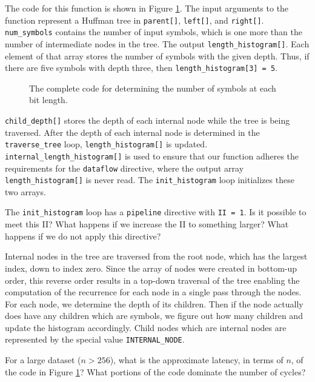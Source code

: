 The code for this function is shown in Figure \ref{fig:huffman_compute_bit_length.cpp}.  The input arguments to the function represent a Huffman tree in \lstinline{parent[]}, \lstinline{left[]}, and \lstinline{right[]}.   \lstinline{num_symbols} contains the number of input symbols, which is one more than the number of intermediate nodes in the tree.  The output \lstinline{length_histogram[]}.  Each element of that array stores the number of symbols with the given depth. Thus, if there are five symbols with depth three, then \lstinline{length_histogram[3] = 5}. 
\begin{figure}
{\tiny }
\caption{The complete code for determining the number of symbols at each bit length.}
\label{fig:huffman_compute_bit_length.cpp}
\end{figure}

\lstinline{child_depth[]} stores the depth of each internal node while the tree is being traversed.  After the depth of each internal node is determined in the \lstinline{traverse_tree} loop, \lstinline{length_histogram[]} is updated.  \lstinline{internal_length_histogram[]} is used to ensure that our function adheres the requirements for the \lstinline{dataflow} directive, where the output array \lstinline{length_histogram[]} is never read.  The \lstinline{init_histogram} loop initializes these two arrays.

\begin{exercise}
The \lstinline{init_histogram} loop has a \lstinline{pipeline} directive with \lstinline{II = 1}. Is it possible to meet this II? What happens if we increase the II to something larger? What happens if we do not apply this directive?
\end{exercise}

Internal nodes in the tree are traversed from the root node, which has the largest index, down to index zero.  Since the array of nodes were created in bottom-up order, this reverse order results in a top-down traversal of the tree enabling the computation of the recurrence for each node in a single pass through the nodes.  For each node, we determine the depth of its children.  Then if the node actually does have any children which are symbols, we figure out how many children and update the histogram accordingly.  Child nodes which are internal nodes are represented by the special value \lstinline{INTERNAL_NODE}.

\begin{exercise}
For a large dataset ($n > 256$), what is the approximate latency, in terms of $n$, of the code in Figure \ref{fig:huffman_compute_bit_length.cpp}?  What portions of the code dominate the number of cycles?
\end{exercise}

